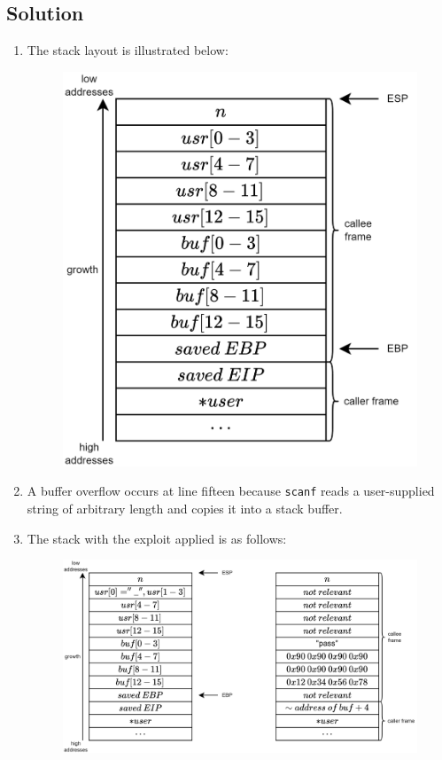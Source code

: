 \subsection*{Solution}
\begin{enumerate}
    \item The stack layout is illustrated below:
        \begin{figure}[H]
            \centering
            \includegraphics[width=0.5\linewidth]{images/stack6.png}
        \end{figure}
    \item A buffer overflow occurs at line fifteen because \texttt{scanf} reads a user-supplied string of arbitrary length and copies it into a stack buffer.
    \item The stack with the exploit applied is as follows:
        \begin{figure}[H]
            \centering
            \includegraphics[width=0.75\linewidth]{images/stack7.png}
        \end{figure}
\end{enumerate}